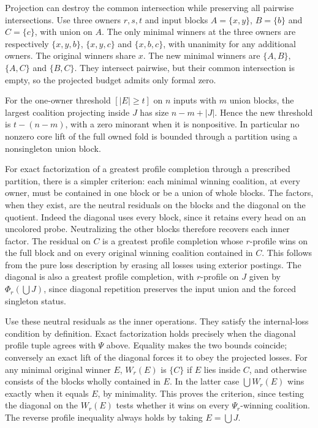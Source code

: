 Projection can destroy the common intersection
while preserving all pairwise intersections. Use
three owners $r,s,t$ and input blocks $A=\{x,y\}$,
$B=\{b\}$ and $C=\{c\}$, with union on $A$. The only
minimal winners at the three owners are respectively
$\{x,y,b\}$, $\{x,y,c\}$ and $\{x,b,c\}$, with
unanimity for any additional owners. The original
winners share $x$. The new minimal winners are
$\{A,B\}$, $\{A,C\}$ and $\{B,C\}$. They intersect
pairwise, but their common intersection is empty,
so the projected budget admits only formal zero.

For the one-owner threshold $[|E|\ge t]$ on $n$
inputs with $m$ union blocks, the largest coalition
projecting inside $J$ has size $n-m+|J|$. Hence the
new threshold is $t-(n-m)$, with a zero minorant
when it is nonpositive. In particular no nonzero
core lift of the full owned fold is bounded through
a partition using a nonsingleton union block.

For exact factorization of a greatest profile completion
through a prescribed partition, there is a simpler
criterion: each minimal winning coalition, at every
owner, must be contained in one block or be a union of
whole blocks. The factors, when they exist, are the
neutral residuals on the blocks and the diagonal on
the quotient. Indeed the diagonal uses every block,
since it retains every head on an uncolored probe.
Neutralizing the other blocks therefore recovers each
inner factor. The residual on $C$ is a greatest
profile completion whose $r$-profile wins on the full
block and on every original winning coalition contained
in $C$. This follows from the pure loss description
by erasing all losses using exterior postings. The
diagonal is also a greatest profile completion, with
$r$-profile on $J$ given by $\Phi_r(\bigcup J)$, since
diagonal repetition preserves the input union and the
forced singleton status.

Use these neutral residuals as the inner operations.
They satisfy the internal-loss condition by definition.
Exact factorization holds precisely when the diagonal
profile tuple agrees with $\Psi$ above. Equality makes
the two bounds coincide; conversely an exact lift of
the diagonal forces it to obey the projected losses.
For any minimal original winner $E$, $W_r(E)$ is
$\{C\}$ if $E$ lies inside $C$, and otherwise consists
of the blocks wholly contained in $E$. In the latter
case $\bigcup W_r(E)$ wins exactly when it equals $E$,
by minimality. This proves the criterion, since testing
the diagonal on the $W_r(E)$ tests whether it wins on
every $\Psi_r$-winning coalition. The reverse profile
inequality always holds by taking $E=\bigcup J$.

